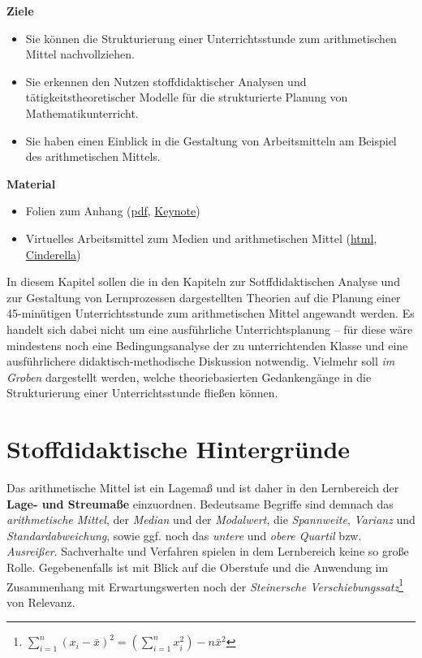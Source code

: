 \documentclass[
]{scrbook}
\providecommand{\tightlist}{%
  \setlength{\itemsep}{0pt}\setlength{\parskip}{0pt}}
\renewenvironment{quote}{
  \list{}{
	\leftmargin0.2cm   %
    \rightmargin\leftmargin
      	\def\FrameCommand
    {%
        {\color{quoteColor}\vrule width 2pt}%
        \hspace{0pt}%
    }%
    \MakeFramed{\advance \hsize -\width \FrameRestore}    \color{quoteColor}
    }
  \item\relax
}
{\endlist\color{black}\endMakeFramed}
\theoremstyle{definition}
\theoremstyle{definition}
\theoremstyle{definition}
\theoremstyle{definition}
\theoremstyle{remark}
\begin{document}
\begin{quote}
\textbf{Ziele}

\begin{itemize}
\tightlist
\item
  Sie können die Strukturierung einer Unterrichtsstunde zum arithmetischen Mittel nachvollziehen.\\
\item
  Sie erkennen den Nutzen stoffdidaktischer Analysen und tätigkeitstheoretischer Modelle für die strukturierte Planung von Mathematikunterricht.\\
\item
  Sie haben einen Einblick in die Gestaltung von Arbeitsmitteln am
  Beispiel des arithmetischen Mittels.
\end{itemize}

\textbf{Material}

\begin{itemize}
\tightlist
\item
  Folien zum Anhang (\href{files/Stoffdidaktik2024-B-ArithmetischesMittel.pdf}{pdf}, \href{files/Stoffdidaktik2024-B-ArithmetischesMittel.key}{Keynote})
\item
  Virtuelles Arbeitsmittel zum Medien und arithmetischen Mittel (\href{files/Stoffdidaktik2024-B-Lagemasse.html}{html}, \href{files/Stoffdidaktik2024-B-Lagemasse.cdy}{Cinderella})
\end{itemize}
\end{quote}

In diesem Kapitel sollen die in den Kapiteln zur Sotffdidaktischen Analyse und zur Gestaltung von Lernprozessen dargestellten Theorien auf die Planung einer 45-minütigen Unterrichtsstunde zum arithmetischen Mittel angewandt werden. Es handelt sich dabei nicht um eine ausführliche Unterrichtsplanung -- für diese wäre mindestens noch eine Bedingungsanalyse der zu unterrichtenden Klasse und eine ausführlichere didaktisch-methodische Diskussion notwendig. Vielmehr soll \emph{im Groben} dargestellt werden, welche theoriebasierten Gedankengänge in die Strukturierung einer Unterrichtsstunde fließen können.

\section{Stoffdidaktische Hintergründe}\label{stoffdidaktische-hintergruxfcnde}

Das \textcolor{formalColor}{arithmetische Mittel} ist ein Lagemaß und ist daher in den Lernbereich der \textbf{Lage- und Streumaße} einzuordnen. Bedeutsame Begriffe sind demnach das \emph{arithmetische Mittel}, der \emph{Median} und der \emph{Modalwert}, die \emph{Spannweite}, \emph{Varianz} und \emph{Standardabweichung}, sowie ggf. noch das \emph{untere} und \emph{obere Quartil} bzw. \emph{Ausreißer}. Sachverhalte und Verfahren spielen in dem Lernbereich keine so große Rolle. Gegebenenfalls ist mit Blick auf die Oberstufe und die Anwendung im Zusammenhang mit Erwartungswerten noch der \emph{Steinersche Verschiebungssatz}\footnote{\(\sum\limits_{i=1}^n (x_i-\bar{x})^2 = \left(\sum\limits_{i=1}^nx_i^2\right)-n\bar{x}^2\)} von Relevanz.
\end{document}
